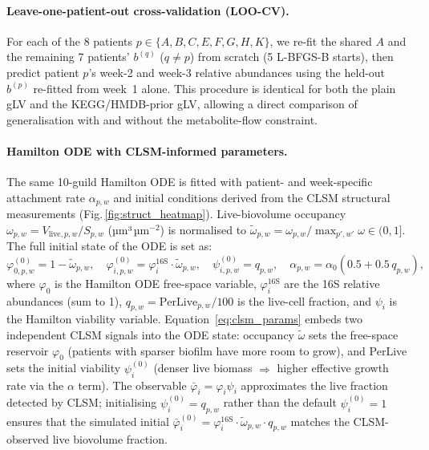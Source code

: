 \documentclass[11pt,a4paper]{article}
\begin{document}
\paragraph{Leave-one-patient-out cross-validation (LOO-CV).}
For each of the 8 patients $p\in\{A,B,C,E,F,G,H,K\}$, we re-fit the shared $A$ and the remaining 7 patients' $b^{(q)}$ ($q\neq p$) from scratch (5 L-BFGS-B starts), then predict patient $p$'s week-2 and week-3 relative abundances using the held-out $b^{(p)}$ re-fitted from week~1 alone.
This procedure is identical for both the plain gLV and the KEGG/HMDB-prior gLV, allowing a direct comparison of generalisation with and without the metabolite-flow constraint.

\paragraph{Hamilton ODE with CLSM-informed parameters.}
The same 10-guild Hamilton ODE is fitted with patient- and week-specific attachment rate $\alpha_{p,w}$ and initial conditions derived from the CLSM structural measurements (Fig.\,\ref{fig:struct_heatmap}).
Live-biovolume occupancy $\omega_{p,w} = V_{\mathrm{live},p,w}/S_{p,w}$ (µm³\,µm$^{-2}$) is normalised to $\tilde\omega_{p,w} = \omega_{p,w}/\max_{p',w'}\omega\in(0,1]$.
The full initial state of the ODE is set as:
\begin{equation}
\varphi_{0,p,w}^{(0)} = 1 - \tilde\omega_{p,w},
\quad
\varphi_{i,p,w}^{(0)} = \varphi_i^{\mathrm{16S}} \cdot \tilde\omega_{p,w},
\quad
\psi_{i,p,w}^{(0)} = q_{p,w},
\quad
\alpha_{p,w} = \alpha_0\!\left(0.5 + 0.5\,q_{p,w}\right),
\label{eq:clsm_params}
\end{equation}
where $\varphi_0$ is the Hamilton ODE free-space variable, $\varphi_i^{\mathrm{16S}}$ are the 16S relative abundances (sum to 1), $q_{p,w}=\text{PerLive}_{p,w}/100$ is the live-cell fraction, and $\psi_i$ is the Hamilton viability variable.
Equation~\eqref{eq:clsm_params} embeds two independent CLSM signals into the ODE state: occupancy $\tilde\omega$ sets the free-space reservoir $\varphi_0$ (patients with sparser biofilm have more room to grow), and PerLive sets the initial viability $\psi_i^{(0)}$ (denser live biomass $\Rightarrow$ higher effective growth rate via the $\alpha$ term).
The observable $\bar\varphi_i = \varphi_i\psi_i$ approximates the live fraction detected by CLSM; initialising $\psi_i^{(0)}=q_{p,w}$ rather than the default $\psi_i^{(0)}=1$ ensures that the simulated initial $\bar\varphi_i^{(0)} = \varphi_i^{\mathrm{16S}}\cdot\tilde\omega_{p,w}\cdot q_{p,w}$ matches the CLSM-observed live biovolume fraction.
\end{document}
